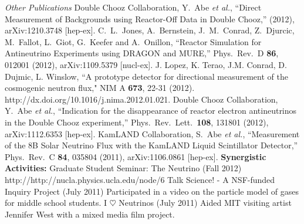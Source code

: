 {\it Other Publications}
\newline \noindent
Double Chooz Collaboration, Y.~Abe {\it et al.}, ``Direct Measurement of Backgrounds using Reactor-Off Data in Double Chooz,'' (2012), arXiv:1210.3748 [hep-ex].
\newline\newline \noindent
C.~L.~Jones, A.~Bernstein, J.~M.~Conrad, Z.~Djurcic, M.~Fallot, L.~Giot, G.~Keefer and A.~Onillon, ``Reactor Simulation for Antineutrino Experiments using DRAGON and MURE,'' Phys.\ Rev.\ D {\bf 86}, 012001 (2012), arXiv:1109.5379 [nucl-ex].
\newline\newline\noindent
J. Lopez, K. Terao, J.M. Conrad, D. Dujmic, L. Winslow, ``A prototype detector for directional measurement of the cosmogenic neutron flux,"  NIM A {\bf 673},  22-31 (2012).
\newline\noindent
http://dx.doi.org/10.1016/j.nima.2012.01.021.
\newline\newline \noindent
Double Chooz Collaboration, Y.~Abe {\it et al.}, ``Indication for the disappearance of reactor electron antineutrinos in the Double Chooz experiment,'' Phys.\ Rev.\ Lett.\  {\bf 108}, 131801 (2012), arXiv:1112.6353 [hep-ex].
\newline\newline \noindent
KamLAND Collaboration, S.~Abe {\it et al.}, ``Measurement of the 8B Solar Neutrino Flux with the KamLAND Liquid Scintillator Detector,'' Phys.\ Rev.\ C {\bf 84}, 035804 (2011), arXiv:1106.0861 [hep-ex].
\newline\newline \noindent
{\bf Synergistic Activities:}
\newline \noindent
Graduate Student Seminar: The Neutrino (Fall 2012)
\newline \noindent
http://http://nucla.physics.ucla.edu/node/6
\newline\newline \noindent
Talk Science! - A NSF-funded Inquiry Project (July 2011)
\newline \noindent
Participated in a video on the particle model of gases for middle school students.
\newline\newline \noindent
I $\heartsuit$ Neutrinos  (July 2011)
\newline \noindent
Aided MIT visiting artist Jennifer West with a mixed media film project.
\newline\newline \noindent
